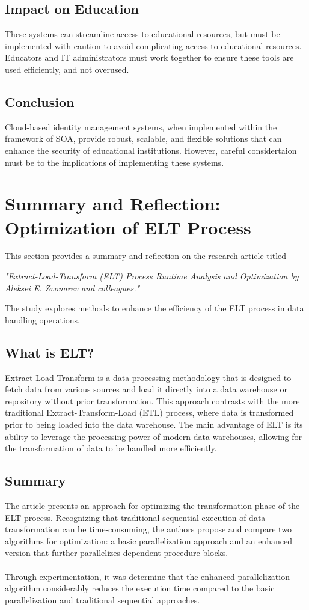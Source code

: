 \documentclass[10pt]{article}
\begin{document}
\subsection{Impact on Education}
These systems can streamline access to educational resources, but must be
implemented with caution to avoid complicating access to educational resources.
Educators and IT administrators must work together to ensure these tools are
used efficiently, and not overused.

\subsection{Conclusion}
Cloud-based identity management systems, when implemented within the framework
of SOA, provide robust, scalable, and flexible solutions that can enhance the
security of educational institutions. However, careful considertaion must be to
the implications of implementing these systems.

	{\newpage}

\section{Summary and Reflection: Optimization of ELT Process}
This section provides a summary and reflection on the research article titled
\begin{center}
	\textit{ "Extract-Load-Transform (ELT) Process Runtime Analysis and
		Optimization by Aleksei E. Zvonarev and colleagues." }\cite{zvonarev2023elt}
\end{center}
The study explores methods to enhance the efficiency of the ELT process in data
handling operations.

\subsection{What is ELT?}
Extract-Load-Transform is a data processing methodology that is designed
to fetch data from various sources and load it directly into a data warehouse or
repository without prior transformation. This approach contrasts with the more
traditional Extract-Transform-Load (ETL) process, where data is transformed
prior to being loaded into the data warehouse. The main advantage of ELT is its
ability to leverage the processing power of modern data warehouses, allowing for
the transformation of data to be handled more efficiently.

\subsection{Summary}
The article presents an approach for optimizing the transformation phase of the
ELT process. Recognizing that traditional sequential execution of data
transformation can be time-consuming, the authors propose and compare two
algorithms for optimization: a basic parallelization approach and an enhanced
version that further parallelizes dependent procedure blocks.
\\ \\
Through experimentation, it was determine that the enhanced parallelization
algorithm considerably reduces the execution time compared to the basic
parallelization and traditional sequential approaches.
\end{document}
